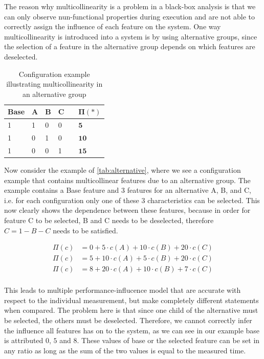 The reason why multicollinearity is a problem in a black-box analysis is
that we can only observe nun-functional properties during execution and are not able to correctly assign the influence of each feature
on the system. One way multicollinearity is introduced into a system is by using alternative groups, since the selection of a feature in the
alternative group depends on which features are deselected. \cite{Multicollinearity}

\begin{table}[h]
    \centering
    \begin{tabular}{llllll}
    \hline
    Base & A & B & C &  & $\bm{\Pi(*)}$ \\ \hline
    1 & 1 & 0 & 0 &  & $\mathbf{5}$  \\
    1 & 0 & 1 & 0 &  & $\mathbf{10}$  \\  
    1 & 0 & 0 & 1 &  & $\mathbf{15}$  \\\hline
    \end{tabular}  
    \caption{Configuration example illustrating multicollinearity in an alternative group}\label{tab:alternative}
\end{table}

Now consider the example of \autoref{tab:alternative}, where we see a configuration example that contains multicollinear features due to an alternative group.
The example contains a Base feature and 3 features for an alternative A, B, and C, i.e. for each configuration only one of these 3 characteristics can be selected.
This now clearly shows the dependence between these features, because in order for feature C to be selected, B and C needs to be deselected, therefore
$C = 1 - B - C$ needs to be satisfied. 

\begin{align*}
    \Pi(c) &= 0 + 5 \cdot c(A) + 10\cdot c(B) + 20\cdot c(C) \\
    \Pi(c) &= 5 + 10 \cdot c(A) + 5\cdot c(B) + 20\cdot c(C) \\
    \Pi(c) &= 8 + 20 \cdot c(A) + 10\cdot c(B) + 7\cdot c(C) \\
\end{align*}

This leads to multiple performance-influcence model that are accurate with respect to the individual measurement, 
but make completely different statements when compared.
The problem here is that since one child of the alternative must be selected, the others must be deselected. Therefore, we cannot correctly infer the influence
all features has on to the system, as we can see in our example base is attributed $0$, $5$ and $8$. 
These values of base or the selected feature can be set in any ratio as long as the sum of the two values is equal to the measured time.

